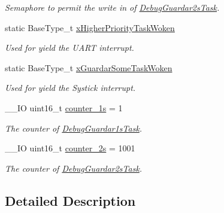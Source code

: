 \begin{DoxyCompactItemize}
\begin{DoxyCompactList}\small\item\em Semaphore to permit the write in of \hyperlink{group___debug___exported___functions___group2_gadc8fe8277ada7992dddff220a145eb5f}{Debug\+Guardar2s\+Task}. \end{DoxyCompactList}\item 
static Base\+Type\+\_\+t \hyperlink{group___debug___private___variables_ga9d9a749ad99ec3d4a6886d5277b9ba87}{x\+Higher\+Priority\+Task\+Woken}\hypertarget{group___debug___private___variables_ga9d9a749ad99ec3d4a6886d5277b9ba87}{}\label{group___debug___private___variables_ga9d9a749ad99ec3d4a6886d5277b9ba87}

\begin{DoxyCompactList}\small\item\em Used for yield the U\+A\+RT interrupt. \end{DoxyCompactList}\item 
static Base\+Type\+\_\+t \hyperlink{group___debug___private___variables_ga5ab62a235f978d6271ac56aa61c477dd}{x\+Guardar\+Some\+Task\+Woken}\hypertarget{group___debug___private___variables_ga5ab62a235f978d6271ac56aa61c477dd}{}\label{group___debug___private___variables_ga5ab62a235f978d6271ac56aa61c477dd}

\begin{DoxyCompactList}\small\item\em Used for yield the Systick interrupt. \end{DoxyCompactList}\item 
\+\_\+\+\_\+\+IO uint16\+\_\+t \hyperlink{group___debug___private___variables_ga141b0389ff1db82e53a437f466e70ed5}{counter\+\_\+1s} = 1\hypertarget{group___debug___private___variables_ga141b0389ff1db82e53a437f466e70ed5}{}\label{group___debug___private___variables_ga141b0389ff1db82e53a437f466e70ed5}

\begin{DoxyCompactList}\small\item\em The counter of \hyperlink{group___debug___exported___functions___group2_ga5e54537eed1694dae3ea8e6cce3f9b3a}{Debug\+Guardar1s\+Task}. \end{DoxyCompactList}\item 
\+\_\+\+\_\+\+IO uint16\+\_\+t \hyperlink{group___debug___private___variables_gace66769896763a0b6444579cc34c8aaf}{counter\+\_\+2s} = 1001\hypertarget{group___debug___private___variables_gace66769896763a0b6444579cc34c8aaf}{}\label{group___debug___private___variables_gace66769896763a0b6444579cc34c8aaf}

\begin{DoxyCompactList}\small\item\em The counter of \hyperlink{group___debug___exported___functions___group2_gadc8fe8277ada7992dddff220a145eb5f}{Debug\+Guardar2s\+Task}. \end{DoxyCompactList}\end{DoxyCompactItemize}


\subsection{Detailed Description}
